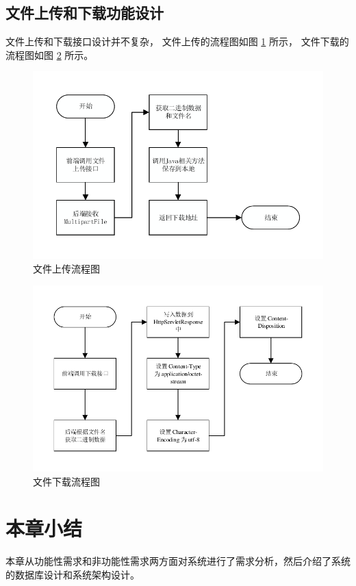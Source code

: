 \subsection{文件上传和下载功能设计}

文件上传和下载接口设计并不复杂，
文件上传的流程图如图 \ref{Fig:seq_upload} 所示，
文件下载的流程图如图 \ref{Fig:seq_download} 所示。

\begin{figure}[ht]
    \centering
    \includegraphics[width=.8\linewidth]{./Figure/IMG_seq_upload.pdf}
    \caption{文件上传流程图}\label{Fig:seq_upload}
\end{figure}

\begin{figure}[ht]
    \centering
    \includegraphics[width=.8\linewidth]{./Figure/IMG_seq_download.pdf}
    \caption{文件下载流程图}\label{Fig:seq_download}
\end{figure}


\section{本章小结}
本章从功能性需求和非功能性需求两方面对系统进行了需求分析，然后介绍了系统的数据库设计和系统架构设计。

